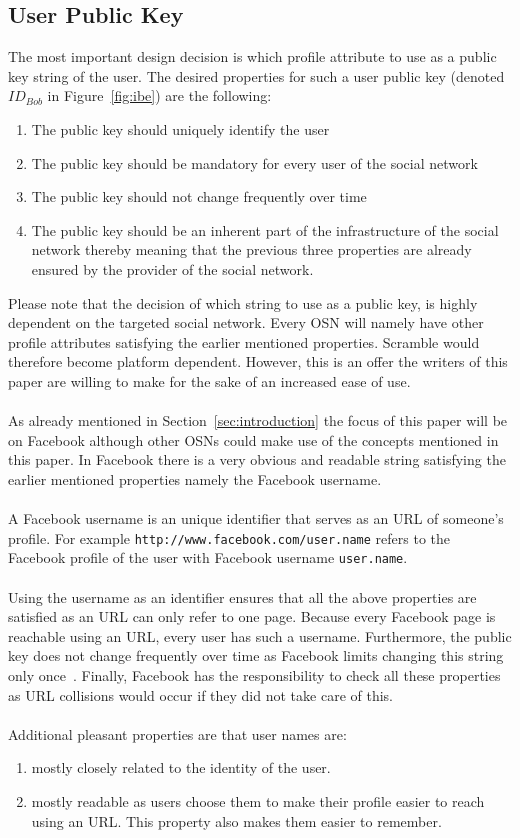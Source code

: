 \documentclass[journal]{IEEEtran}
\begin{document}
\subsection{User Public Key}
The most important design decision is which profile attribute to use as a public
key string of the user. The desired properties for such a user public key
(denoted $ID_{Bob}$ in Figure~\ref{fig:ibe}) are the following:
\begin{enumerate}
 \item The public key should uniquely identify the user
 \item The public key should be mandatory for every user of the social network
 \item The public key should not change frequently over time
 \item The public key should be an inherent part of the infrastructure of the
social network thereby meaning that the previous three properties are already
ensured by the provider of the social network.
\end{enumerate}
Please note that the decision of which string to use as a public key, is
highly dependent on the targeted social network. Every OSN will namely have
other profile attributes satisfying the earlier mentioned properties. Scramble
would therefore become platform dependent. However, this is an offer the writers
of this paper are willing to make for the sake of an increased ease of use.\\
\\
As already mentioned in Section~\ref{sec:introduction} the focus of this paper
will be on Facebook although other OSNs could make use of the concepts
mentioned in this paper. In Facebook there is a very obvious and readable
string satisfying the earlier mentioned properties namely the Facebook
username.\\
\\
A Facebook username is an unique identifier that serves as an URL of
someone's profile. For example \texttt{http://www.facebook.com/user.name}
refers to the Facebook profile of the user with Facebook username
\texttt{user.name}.\\
\\
Using the username as an identifier ensures that all the above properties are
satisfied as an URL can only refer to one page. Because every Facebook page is
reachable using an URL, every user has such a username. Furthermore, the public
key does not change frequently over time as Facebook limits changing this string
only once~\cite{FacebookUsername}. Finally, Facebook has the responsibility to
check all these properties as URL collisions would occur if they did not take
care of this.\\
\\
Additional pleasant properties are that user names are:
\begin{enumerate}
 \item mostly closely related to the identity of the user. 
 \item mostly readable as users choose them to make their profile easier to
reach using an URL. This property also makes them easier to remember.
\end{enumerate}
\end{document}
